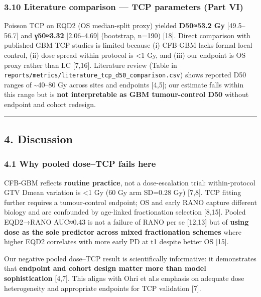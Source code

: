 \documentclass[
  11pt,
]{article}
\begin{document}
\subsubsection{3.10 Literature comparison --- TCP parameters (Part
VI)}\label{literature-comparison-tcp-parameters-part-vi}

Poisson TCP on EQD2 (OS median-split proxy) yielded \textbf{D50≈53.2 Gy}
{[}49.5--56.7{]} and \textbf{γ50≈3.32} {[}2.06--4.69{]} (bootstrap,
n=190) {[}18{]}. Direct comparison with published GBM TCP studies is
limited because (i) CFB-GBM lacks formal local control, (ii) dose spread
within protocol is \textless1 Gy, and (iii) our endpoint is OS proxy
rather than LC {[}7,16{]}. Literature review (Table in
\texttt{reports/metrics/literature\_tcp\_d50\_comparison.csv}) shows
reported D50 ranges of \textasciitilde40--80 Gy across sites and
endpoints {[}4,5{]}; our estimate falls within this range but is
\textbf{not interpretable as GBM tumour-control D50} without endpoint
and cohort redesign.

\begin{center}\rule{0.5\linewidth}{0.5pt}\end{center}

\subsection{4. Discussion}\label{discussion}

\subsubsection{4.1 Why pooled dose--TCP fails
here}\label{why-pooled-dosetcp-fails-here}

CFB-GBM reflects \textbf{routine practice}, not a dose-escalation trial:
within-protocol GTV Dmean variation is \textless1 Gy (60 Gy arm SD=0.28
Gy) {[}7,8{]}. TCP fitting further requires a tumour-control endpoint;
OS and early RANO capture different biology and are confounded by
age-linked fractionation selection {[}8,15{]}. Pooled EQD2→RANO AUC≈0.43
is not a failure of RANO per se {[}12,13{]} but of \textbf{using dose as
the sole predictor across mixed fractionation schemes} where higher EQD2
correlates with more early PD at t1 despite better OS {[}15{]}.

Our negative pooled dose--TCP result is scientifically informative: it
demonstrates that \textbf{endpoint and cohort design matter more than
model sophistication} {[}4,7{]}. This aligns with Ohri et
al.\textquotesingle s emphasis on adequate dose heterogeneity and
appropriate endpoints for TCP validation {[}7{]}.
\end{document}
